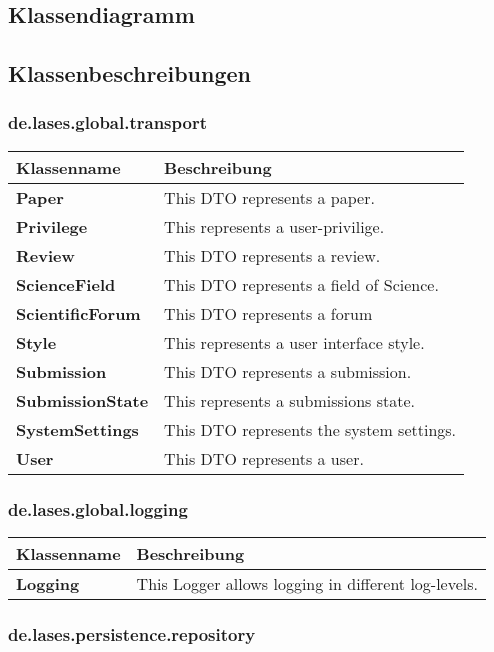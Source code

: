 
\newcommand{\classtable}[1]{\begin{longtable}[H]{m{5cm}m{9cm}}
		\hline
		\textbf{Klassenname} & \textbf{Beschreibung} \\
		\hline
		\hline
		#1
	\end{longtable}
}

\newcommand{\classentry}[2]{\textbf{#1} & #2 \\
	}


\subsection{Klassendiagramm}


\subsection{Klassenbeschreibungen}

\subsubsection{de.lases.global.transport}

\classtable{
    \classentry{Paper}{This DTO represents a paper.}
    \classentry{Privilege}{This represents a user-privilige.}
    \classentry{Review}{This DTO represents a review.}
    \classentry{ScienceField}{This DTO represents a field of Science.}
    \classentry{ScientificForum}{This DTO represents a forum}
    \classentry{Style}{This represents a user interface style.}
    \classentry{Submission}{This DTO represents a submission.}
    \classentry{SubmissionState}{This represents a submissions state.}
    \classentry{SystemSettings}{This DTO represents the system settings.}
    \classentry{User}{This DTO represents a user.}
}

\subsubsection{de.lases.global.logging}

\classtable{
	\classentry{Logging}{This Logger allows logging in different log-levels.}
}

\subsubsection{de.lases.persistence.repository}

